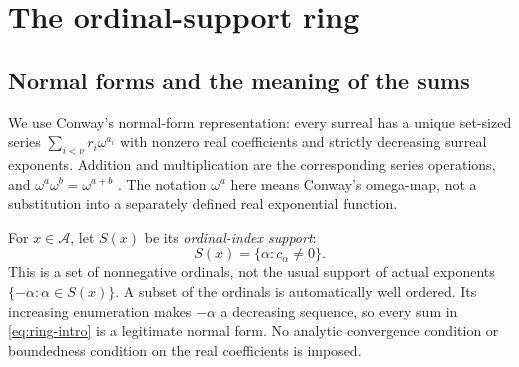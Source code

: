 \documentclass[11pt,letterpaper]{article}
\theoremstyle{definition}
\theoremstyle{remark}
\newcommand{\A}{\mathscr{A}}
\begin{document}
\section{The ordinal-support ring}

\subsection{Normal forms and the meaning of the sums}
We use Conway's normal-form representation: every surreal has a unique
set-sized series \(\sum_{i<\nu}r_i\omega^{a_i}\) with nonzero real
coefficients and strictly decreasing surreal exponents. Addition and
multiplication are the corresponding series operations, and
\(\omega^a\omega^b=\omega^{a+b}\)
\cite[Sections~8--10]{Berarducci}. The notation \(\omega^a\) here
means Conway's omega-map, not a substitution into a separately defined
real exponential function.

For \(x\in\A\), let \(S(x)\) be its \emph{ordinal-index support}:
\[
 S(x)=\{\alpha:c_\alpha\ne0\}.
\]
This is a set of nonnegative ordinals, not the usual support of actual
exponents \(\{-\alpha:\alpha\in S(x)\}\). A subset of the ordinals
is automatically well ordered. Its increasing enumeration makes
\(-\alpha\) a decreasing sequence, so every sum in
\eqref{eq:ring-intro} is a legitimate normal form. No analytic convergence
condition or boundedness condition on the real coefficients is imposed.
\end{document}
